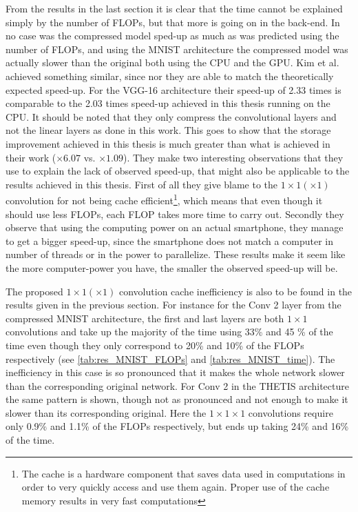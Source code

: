 From the results in the last section it is clear that the time cannot be explained simply by the number of FLOPs, but that more is going on in the back-end. In no case was the compressed model sped-up as much as was predicted using the number of FLOPs, and using the MNIST architecture the compressed model was actually slower than the original both using the CPU and the GPU. Kim et al. achieved something similar\cite{Kim2016}, since nor they are able to match the theoretically expected speed-up. For the VGG-16 architecture their speed-up of 2.33 times is comparable to the 2.03 times speed-up achieved in this thesis running on the CPU. It should be noted that they only compress the convolutional layers and not the linear layers as done in this work. This goes to show that the storage improvement achieved in this thesis is much greater than what is achieved in their work ($\times 6.07$ vs. $\times 1.09$). They make two interesting observations that they use to explain the lack of observed speed-up, that might also be applicable to the results achieved in this thesis. First of all they give blame to the $1\times 1 (\times 1)$ convolution for not being cache efficient\footnote{The cache is a hardware component that saves data used in computations in order to very quickly access and use them again. Proper use of the cache memory results in very fast computations}, which means that even though it should use less FLOPs, each FLOP takes more time to carry out. Secondly they observe that using the computing power on an actual smartphone, they manage to get a bigger speed-up, since the smartphone does not match a computer in number of threads or in the power to parallelize. These results make it seem like the more computer-power you have, the smaller the observed speed-up will be. 

The proposed $1\times 1 (\times 1)$ convolution cache inefficiency is also to be found in the results given in  the previous section. For instance for the Conv 2 layer from the compressed MNIST architecture, the first and last layers are both $1\times 1$ convolutions and take up the majority of the time using 33\% and 45 \% of the time even though they only correspond to 20\% and 10\% of the FLOPs respectively (see \autoref{tab:res_MNIST_FLOPs} and \autoref{tab:res_MNIST_time}). The inefficiency in this case is so pronounced that it makes the whole network slower than the corresponding original network. For Conv 2 in the THETIS architecture the same pattern is shown, though not as pronounced and not enough to make it slower than its corresponding original. Here the $1\times 1 \times 1$ convolutions require only 0.9\% and 1.1\% of the FLOPs respectively, but ends up taking 24\% and 16\% of the time.

